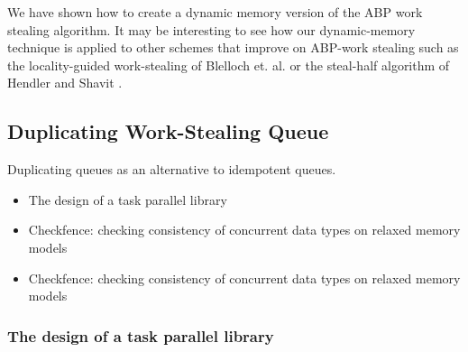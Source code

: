 We have shown how to create a dynamic memory version of the ABP work
stealing algorithm. It may be interesting to see how our
dynamic-memory technique is applied to other schemes that improve on
ABP-work stealing such as the locality-guided work-stealing of
Blelloch et. al. \cite{Acar2002} or the steal-half algorithm of
Hendler and Shavit \cite{Hendler2002}.











\subsection{Duplicating Work-Stealing Queue}

Duplicating queues as an alternative to idempotent queues.

\begin{itemize}
\item The design of a task parallel library \cite{Leijen2009}
\item Checkfence: checking consistency of concurrent data types on
  relaxed memory models \cite{Burckhardt2007}
\item Checkfence: checking consistency of concurrent data types on
  relaxed memory models \cite{Burckhardt2007a}
\end{itemize}

\subsubsection{The design of a task parallel library \cite{Leijen2009}}

